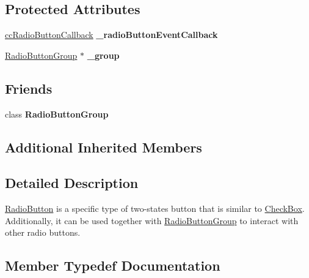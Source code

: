 \subsection*{Protected Attributes}
\begin{DoxyCompactItemize}
\item 
\mbox{\label{classui_1_1RadioButton_a284017e00d6a0746f513dfccff748968}} 
\hyperlink{classui_1_1RadioButton_a14dd0e15b76ab9ce823593a677cb777f}{cc\+Radio\+Button\+Callback} {\bfseries \+\_\+radio\+Button\+Event\+Callback}
\item 
\mbox{\label{classui_1_1RadioButton_ae09e60ea58c5484028558fb823907b05}} 
\hyperlink{classui_1_1RadioButtonGroup}{Radio\+Button\+Group} $\ast$ {\bfseries \+\_\+group}
\end{DoxyCompactItemize}
\subsection*{Friends}
\begin{DoxyCompactItemize}
\item 
\mbox{\label{classui_1_1RadioButton_a4cc6050e6a48bae783431f7e414bd7bd}} 
class {\bfseries Radio\+Button\+Group}
\end{DoxyCompactItemize}
\subsection*{Additional Inherited Members}


\subsection{Detailed Description}
\hyperlink{classui_1_1RadioButton}{Radio\+Button} is a specific type of two-\/states button that is similar to \hyperlink{classui_1_1CheckBox}{Check\+Box}. Additionally, it can be used together with \hyperlink{classui_1_1RadioButtonGroup}{Radio\+Button\+Group} to interact with other radio buttons. 

\subsection{Member Typedef Documentation}
\mbox{\label{classui_1_1RadioButton_a14dd0e15b76ab9ce823593a677cb777f}} 
